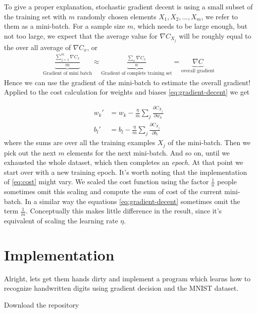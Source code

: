 \documentclass[10pt]{book}
\begin{document}
    To give a proper explanation, stochastic gradient decent is using a small subset of the training set with \(m\) randomly chosen elements \(X_1, X_2, ..., X_m\), we refer to them as a mini-batch. For a sample size
    \(m\), which needs to be large enough, but not too large, we expect that the average value for \(\nabla C_{X_j}\) will be roughly equal to the over all average of \(\nabla C_x\), or
    \begin{align}
        \underbrace{\frac{\sum_{j=1}^m \nabla C_x}{m}}_{\text{Gradient of mini batch}}
        \approx \underbrace{\frac{\sum_x \nabla C_x}{n}}_{\text{Gradient of complete training set}}
        = \underbrace{\nabla C}_{\text{overall gradient}}
    \end{align}
    Hence we can use the gradient of the mini-batch to estimate the overall gradient!
    Applied to the cost calculation for weights and biases \eqref{eq:gradient-decent} we get
    
    \begin{align}
        w_k' &= w_k - \frac{\eta}{m} \sum_j \frac{\partial C_{X_j}}{\partial w_k}\\
        b_l' &= b_l - \frac{\eta}{m} \sum_j \frac{\partial C_{X_j}}{\partial b_l}
    \end{align}
    where the sums are over all the training examples \(X_j\) of the mini-batch. Then we pick out the next \(m\)
    elements for the next mini-batch. And so on, until we exhausted the whole dataset, which then completes an \textit{epoch}.
    At that point we start over with a new training epoch.\newline
    It's worth noting that the implementation of \eqref{eq:cost} might vary. We scaled the cost function using the factor \(\frac{1}{n}\) people sometimes
    omit this scaling and compute the sum of cost of the current mini-batch. In a similar way the equations \eqref{eq:gradient-decent} sometimes omit the term \(\frac{1}{m}\).
    Conceptually this makes little difference in the result, since it's equivalent of scaling the learning rate \(\eta\).

    \section{Implementation}
    Alright, lets get them hands dirty and implement a program which learns how to recognize handwritten digits using gradient decision and the MNIST dataset.
    
    Download the repository
\end{document}
